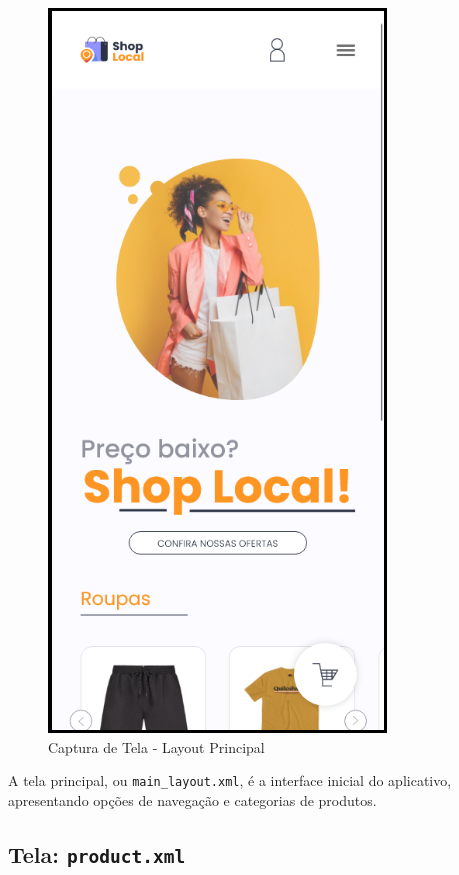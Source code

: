 \documentclass[
	12pt,				%
	openright,			%
	twoside,			%
	a4paper,			%
	english,			%
	brazil				%
	]{abntex2}
\begin{document}
\begin{figure}[htb]
    \centering
    \includegraphics[width=0.8\textwidth]{img/main_layout}
    \caption{Captura de Tela - Layout Principal}
\end{figure}

A tela principal, ou \texttt{main\_layout.xml}, é a interface inicial do aplicativo, apresentando opções de navegação e categorias de produtos.

\subsection{Tela: \texttt{product.xml}}
\end{document}
